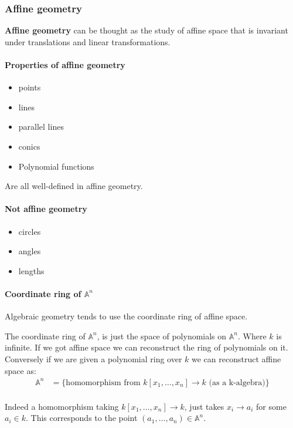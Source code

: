 \subsubsection{Affine geometry}
\begin{definition}
    \textbf{Affine geometry} can be thought as the study of affine space that is invariant under translations and linear transformations.
\end{definition}

\paragraph*{Properties of affine geometry}

\begin{itemize}
    \item points
    \item lines
    \item parallel lines
    \item conics
    \item Polynomial functions
\end{itemize}

Are all well-defined in affine geometry.

\paragraph*{Not affine geometry}
\begin{itemize}
    \item circles
    \item angles
    \item lengths
\end{itemize}

\paragraph*{Coordinate ring of $\mathbb{A}^n$}
Algebraic geometry tends to use the coordinate ring of affine space.\begin{definition}
    The coordinate ring of $\mathbb{A}^n$, is just the space of polynomials on $\mathbb{A}^n$. Where $k$ is infinite.
    If we got affine space we can reconstruct the ring of polynomials on it. Conversely if we are given a polynomial ring over $k$ we can reconstruct affine space as:\begin{align*}
        \mathbb{A}^n &= \{\text{homomorphism from }k[x_1,\dots,x_n] \rightarrow k \text{ (as a k-algebra)} \}\\ 
    \end{align*}
    
    Indeed a homomorphism taking $k[x_1,\dots,x_n]\rightarrow k$, just takes $x_i\rightarrow a_i$ for some $a_i\in k$. This corresponds to the point $(a_1,\dots,a_n)\in \mathbb{A}^n$.    
\end{definition}

